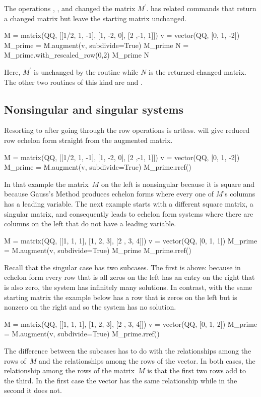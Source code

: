 The operations ,
, and 
changed the matrix $M^\prime$.
\Sage{} has related commands that return a changed matrix
but leave the starting matrix unchanged.
\begin{sageoutput}
M = matrix(QQ, [[1/2, 1, -1], [1, -2, 0], [2 ,-1, 1]])
v = vector(QQ, [0, 1, -2])
M_prime = M.augment(v, subdivide=True) 
M_prime
N = M_prime.with_rescaled_row(0,2)
M_prime
N      
\end{sageoutput}
\noindent
Here, $M^\prime$ is unchanged by the routine while $N$ is the returned 
changed matrix.
The other two routines of this kind are  
and .




\subsection{Nonsingular and singular systems}
Resorting to  after going through the row operations is artless.
\Sage{} will give reduced row echelon form straight from the augmented matrix.
\begin{sageoutput}
M = matrix(QQ, [[1/2, 1, -1], [1, -2, 0], [2 ,-1, 1]])
v = vector(QQ, [0, 1, -2])
M_prime = M.augment(v, subdivide=True) 
M_prime.rref()
\end{sageoutput}

In that example the matrix~$M$ on the left is nonsingular because it is 
square and because Gauss's Method produces echelon forms where every one of
$M$'s columns has a leading variable.
The next example starts with a different square matrix, a 
singular matrix, and consequently leads to 
echelon form systems where there are columns on the left 
that do not have a leading variable. 
\begin{sageoutput}
M = matrix(QQ, [[1, 1, 1], [1, 2, 3], [2 , 3, 4]])    
v = vector(QQ, [0, 1, 1]) 
M_prime = M.augment(v, subdivide=True)
M_prime
M_prime.rref()
\end{sageoutput}
\noindent
Recall that the singular case has two subcases.
The first is above: because in echelon form
every row that is all zeros on the
left has an entry on the right that is also zero,
the system has infinitely many solutions.
In contrast, with the same starting matrix
the example below has a row that is zeros on the left but is nonzero
on the right and so the system has no solution.
\begin{sageoutput}[d,0,1]
M = matrix(QQ, [[1, 1, 1], [1, 2, 3], [2 , 3, 4]])    
v = vector(QQ, [0, 1, 2])             
M_prime = M.augment(v, subdivide=True)
M_prime.rref()                        
\end{sageoutput}
\noindent
The difference between the subcases
has to do with the relationships among  
the rows of~$M$ and the relationships among the rows of the vector.
In both cases, the relationship among the rows of the matrix~$M$
is that the first two rows add to the third.
In the first case the vector has the same relationship while in the second
it does not.

